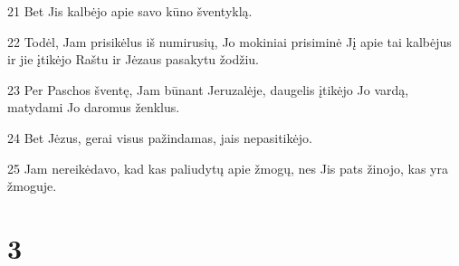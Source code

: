 \par 21 Bet Jis kalbėjo apie savo kūno šventyklą. 
\par 22 Todėl, Jam prisikėlus iš numirusių, Jo mokiniai prisiminė Jį apie tai kalbėjus ir jie įtikėjo Raštu ir Jėzaus pasakytu žodžiu. 
\par 23 Per Paschos šventę, Jam būnant Jeruzalėje, daugelis įtikėjo Jo vardą, matydami Jo daromus ženklus. 
\par 24 Bet Jėzus, gerai visus pažindamas, jais nepasitikėjo. 
\par 25 Jam nereikėdavo, kad kas paliudytų apie žmogų, nes Jis pats žinojo, kas yra žmoguje.


\chapter{3}


